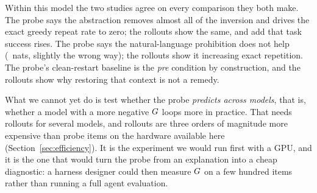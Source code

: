 Within this model the two studies agree on every comparison they both make. The
probe says the abstraction removes almost all of the inversion and drives the
exact greedy repeat rate to zero; the rollouts show the same, and add that task
success rises. The probe says the natural-language prohibition does not help
(\DInstructionCI\ nats, slightly the wrong way); the rollouts show it increasing
exact repetition. The probe's clean-restart baseline is the \emph{pre}
condition by construction, and the rollouts show why restoring that context is
not a remedy.

What we cannot yet do is test whether the probe \emph{predicts across models},
that is, whether a model with a more negative $G$ loops more in practice. That needs
rollouts for several models, and rollouts are three orders of magnitude more
expensive than probe items on the hardware available here (Section~\ref{sec:efficiency}).
It is the experiment we would run first with a GPU, and it is the one that would
turn the probe from an explanation into a cheap diagnostic: a harness designer
could then measure $G$ on a few hundred items rather than running a full
agent evaluation.
